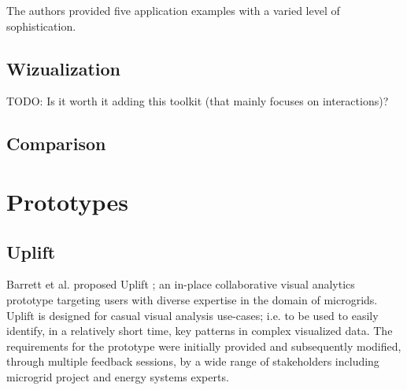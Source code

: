 \documentclass{vgtc}                          %
\begin{document}
\noindent The authors provided five application examples with a varied level of
sophistication.

\subsection{Wizualization}

TODO: Is it worth it adding this toolkit (that mainly focuses on interactions)?

\subsection{Comparison}

\section{Prototypes}
\subsection{Uplift}
Barrett et al. proposed Uplift \cite{uplift_prototype}; an in-place
collaborative visual analytics prototype targeting users with diverse
expertise in the domain of microgrids. Uplift is designed for casual visual
analysis use-cases; i.e. to be used to easily identify, in a relatively short
time, key patterns in complex visualized data. The requirements for the
prototype were initially provided and subsequently modified, through multiple
feedback sessions, by a wide range of stakeholders including microgrid project
and energy systems experts.
\end{document}
